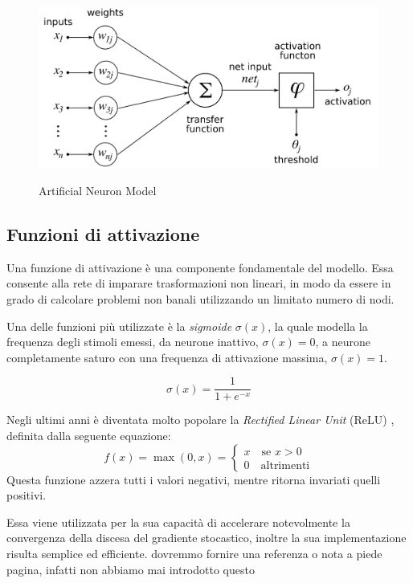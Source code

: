 \begin{figure}[htb]
	\centering
	{\includegraphics[width=.7\textwidth]{images/ArtificialNeuronModel}} 
	\caption{Artificial Neuron Model}
	\label{fig:Modello matematico di un neurone artificiale}
\end{figure}

\subsection{Funzioni di attivazione}
\label{subsec:fattivazione}
Una funzione di attivazione è una componente fondamentale del modello. Essa consente alla rete di imparare trasformazioni non lineari, in modo da essere in grado di calcolare problemi non banali utilizzando un limitato numero di nodi.

Una delle funzioni più utilizzate è la \emph{sigmoide} $\sigma(x)$, la quale modella la frequenza degli stimoli emessi, da neurone inattivo, $\sigma(x)=0$, a neurone completamente saturo con una frequenza di attivazione massima, $\sigma(x)=1$.

\begin{equation}
\sigma(x) = \frac{1}{1+e^{-x}}
\label{eq:sigmoid}
\end{equation}


Negli ultimi anni è diventata molto popolare la \emph{Rectified Linear Unit} (ReLU) \cite{nair2010rectified,hahnloser2000digital,hahnloser2003permitted,glorot2011deep}, definita dalla seguente equazione:
\begin{equation}
f (x) = \max(0, x)= \begin{cases}
x \quad \mbox{se } x>0\\
0 \quad \mbox{altrimenti}
\end{cases}
\label{eq:relu}
\end{equation}
Questa funzione azzera tutti i valori negativi, mentre ritorna invariati quelli positivi.

Essa viene utilizzata per la sua capacità di accelerare notevolmente la convergenza della discesa del gradiente stocastico, inoltre la sua implementazione risulta semplice ed efficiente. {\color{red}dovremmo fornire una referenza o nota a piede pagina, infatti non abbiamo mai introdotto questo}

